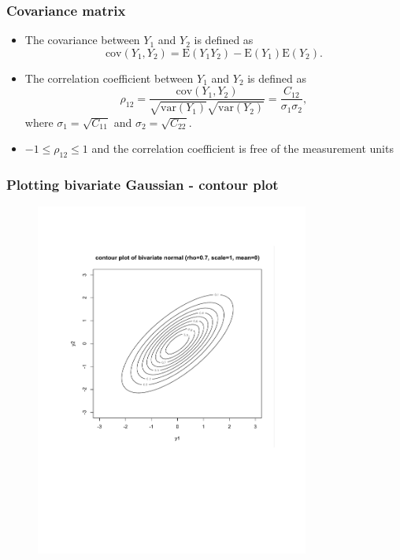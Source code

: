 \documentclass[handout]{beamer}
\begin{document}
\begin{frame}
\frametitle{Covariance matrix}
\begin{itemize}[<+-| alert@+>]
    \item The covariance between $Y_1$ and $Y_2$ is defined as 
        $$\mbox{cov}( Y_1,Y_2) = \mbox{E}(Y_1 Y_2) - \mbox{E}(Y_1)\mbox{E}(Y_2).$$

    \item The correlation coefficient between $Y_1$ and $Y_2$ is defined as 
$$\rho_{12} = \frac{ \mbox{cov}(Y_1,Y_2) }{ \sqrt{ \mbox{var}(Y_1) }\sqrt{ \mbox{var}(Y_2)} } 
= \frac{ C_{12} }{ \sigma_1 \sigma_2 },$$
where $\sigma_1 = \sqrt{C_{11}}$ and $\sigma_2 = \sqrt{C_{22}}$.

\item $-1 \le \rho_{12} \le 1$ and the correlation coefficient is free of the measurement units
\end{itemize}
\end{frame}

\begin{frame}
\frametitle{Plotting bivariate Gaussian - contour plot}
\begin{figure}[!t]
\centerline{\includegraphics[width=9cm]{lecture10fig1}}
\end{figure}
\end{frame}
\end{document}
